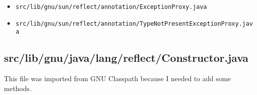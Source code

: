 \documentclass[a4paper, 10pt, titlepage]{scrartcl} %
\begin{document}
\begin{itemize}
 \item \begin{scriptsize}\verb|src|\hspace{0.0pt}\verb|/|\hspace{0.0pt}\verb|lib|\hspace{0.0pt}\verb|/|\hspace{0.0pt}\verb|gnu|\hspace{0.0pt}\verb|/|\hspace{0.0pt}\verb|sun|\hspace{0.0pt}\verb|/|\hspace{0.0pt}\verb|reflect|\hspace{0.0pt}\verb|/|\hspace{0.0pt}\verb|annotation|\hspace{0.0pt}\verb|/|\hspace{0.0pt}\verb|ExceptionProxy|\hspace{0.0pt}\verb|.|\hspace{0.0pt}\verb|java|\end{scriptsize}
 \item \begin{scriptsize}\verb|src|\hspace{0.0pt}\verb|/|\hspace{0.0pt}\verb|lib|\hspace{0.0pt}\verb|/|\hspace{0.0pt}\verb|gnu|\hspace{0.0pt}\verb|/|\hspace{0.0pt}\verb|sun|\hspace{0.0pt}\verb|/|\hspace{0.0pt}\verb|reflect|\hspace{0.0pt}\verb|/|\hspace{0.0pt}\verb|annotation|\hspace{0.0pt}\verb|/|\hspace{0.0pt}\verb|TypeNotPresentExceptionProxy|\hspace{0.0pt}\verb|.|\hspace{0.0pt}\verb|java|\end{scriptsize}
\end{itemize}

\subsection{src/lib/gnu/java/lang/reflect/Constructor.java}
\label{sec:src/lib/gnu/java/lang/reflect/Constructor.java}

This file was imported from GNU Classpath because I needed to add some methods.
\end{document}
